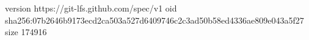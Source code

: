 version https://git-lfs.github.com/spec/v1
oid sha256:07b2646b9173ecd2ca503a527d6409746c2c3ad50b58ed4336ae809e043a5f27
size 174916
